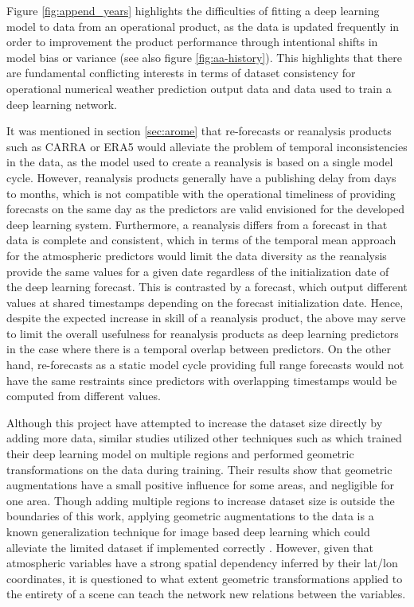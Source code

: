 \documentclass[../main/thesis]{subfiles}
\begin{document}
Figure \ref{fig:append_years} highlights the difficulties of fitting a deep learning model to data from an operational product, as the data is updated frequently in order to improvement the product performance through intentional shifts in model bias or variance \citep{Batrak2019} (see also figure \ref{fig:aa-history}). This highlights that there are fundamental conflicting interests in terms of dataset consistency for operational numerical weather prediction output data and data used to train a deep learning network. 

It was mentioned in section \ref{sec:arome} that re-forecasts or reanalysis products such as CARRA \citep{Koeltzow2022} or ERA5 \citep{Hersbach2020} would alleviate the problem of temporal inconsistencies in the data, as the model used to create a reanalysis is based on a single model cycle. However, reanalysis products generally have a publishing delay from days to months, which is not compatible with the operational timeliness of providing forecasts on the same day as the predictors are valid envisioned for the developed deep learning system. Furthermore, a reanalysis differs from a forecast in that data is complete and consistent, which in terms of the temporal mean approach for the atmospheric predictors would limit the data diversity as the reanalysis provide the same values for a given date regardless of the initialization date of the deep learning forecast. This is contrasted by a forecast, which output different values at shared timestamps depending on the forecast initialization date. Hence, despite the expected increase in skill of a reanalysis product, the above may serve to limit the overall usefulness for reanalysis products as deep learning predictors in the case where there is a temporal overlap between predictors. On the other hand, re-forecasts as a static model cycle providing full range forecasts would not have the same restraints since predictors with overlapping timestamps would be computed from different values. 

Although this project have attempted to increase the dataset size directly by adding more data, similar studies utilized other techniques such as \citet{Grigoryev2022} which trained their deep learning model on multiple regions and performed geometric transformations on the data during training. Their results show that geometric augmentations have a small positive influence for some areas, and negligible for one area. Though adding multiple regions to increase dataset size is outside the boundaries of this work, applying geometric augmentations to the data is a known generalization technique for image based deep learning which \citet{Grigoryev2022} could alleviate the limited dataset if implemented correctly \citep{Shorten2019}. However, given that atmospheric variables have a strong spatial dependency inferred by their lat/lon coordinates, it is questioned to what extent geometric transformations applied to the entirety of a scene can teach the network new relations between the variables.
\end{document}
